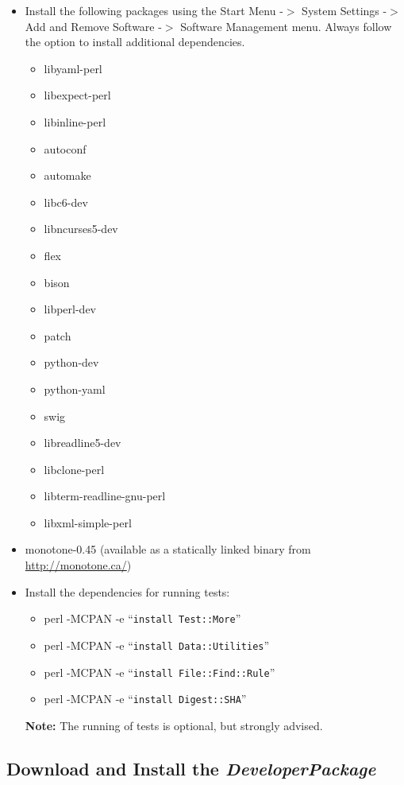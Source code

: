\documentclass[12pt]{article}
\begin{document}
\begin{itemize}
\item[] Install the following packages using the Start Menu -$>$
  System Settings -$>$ Add and Remove Software -$>$ Software
  Management menu.  Always follow the option to install additional
  dependencies.
      \begin{itemize}
         \item libyaml-perl
         \item libexpect-perl
         \item libinline-perl
         \item autoconf
         \item automake
         \item libc6-dev
         \item libncurses5-dev
         \item flex
         \item bison
         \item libperl-dev
         \item patch
         \item python-dev
         \item python-yaml
         \item swig
         \item libreadline5-dev
         \item libclone-perl
         \item libterm-readline-gnu-perl
         \item libxml-simple-perl
      \end{itemize}
   \item[] monotone-0.45 (available as a statically linked binary from \href{http://monotone.ca/}{http://monotone.ca/})
   \item[] Install the dependencies for running tests:
      \begin{itemize}
         \item perl -MCPAN -e ``{\tt install Test::More}''
         \item perl -MCPAN -e ``{\tt install Data::Utilities}''
         \item perl -MCPAN -e ``{\tt install File::Find::Rule}''
         \item perl -MCPAN -e ``{\tt install Digest::SHA}''
      \end{itemize}   
      {\bf Note:} The running of tests is optional, but strongly advised.
 \end{itemize}

\subsection*{Download and Install the {\it DeveloperPackage}}
\end{document}
